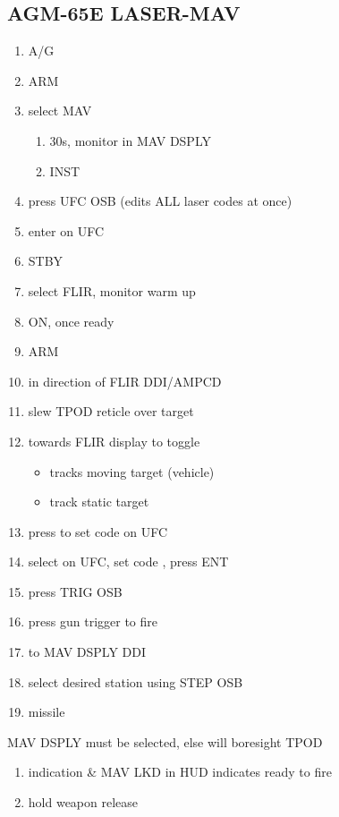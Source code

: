 \documentclass[fontInter, widesubsec]{TechCheck}
\begin{document}
	\subsection{AGM-65E LASER-MAV}
	\begin{enumerate}
		\item {}\dotfill A/G
		\item {}\dotfill ARM
		\item {}\dotfill select MAV
		\begin{enumerate}
			\item {}\dotfill 30s, monitor in MAV DSPLY
			\item {}\dotfill INST
		\end{enumerate}
		\item {}\dotfill press UFC OSB (edits ALL laser codes at once)
		\item {}\dotfill enter on UFC
		\item {}\dotfill STBY
		\item {}\dotfill select FLIR, monitor warm up
		\item {}\dotfill ON, once ready
		\item {}\dotfill ARM
		\item {}\dotfill in direction of FLIR DDI/AMPCD
		\item {}\dotfill slew TPOD reticle over target
		\item {}\dotfill towards FLIR display to toggle
		\begin{itemize}
			\item {} tracks moving target (vehicle)
			\item {} track static target
		\end{itemize}
	\item {}\dotfill press to set code on UFC
	\item {}\dotfill select on UFC, set code , press ENT
	\item {}\dotfill press TRIG OSB
	\item {}\dotfill press gun trigger to fire
	\item {}\dotfill to MAV DSPLY DDI
	\item {}\dotfill select desired station using STEP OSB
	\item {}\dotfill missile
	\end{enumerate}
	\thumbnar
	 MAV DSPLY must be selected, else will boresight TPOD
	\begin{enumerate}[resume]
	\item {}\dotfill indication \& MAV LKD in HUD indicates ready to fire
	\item {}\dotfill hold weapon release
	\end{enumerate}
\end{document}
